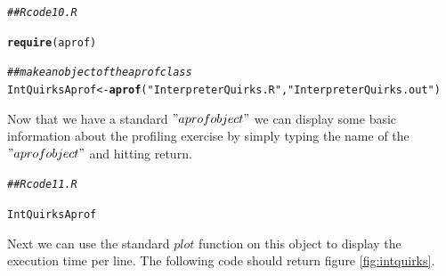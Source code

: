 \documentclass{article}\usepackage[]{graphicx}\usepackage[]{color}
\makeatletter
\newcommand{\hlstr}[1]{\textcolor[rgb]{0.192,0.494,0.8}{#1}}%
\newcommand{\hlcom}[1]{\textcolor[rgb]{0.678,0.584,0.686}{\textit{#1}}}%
\newcommand{\hlstd}[1]{\textcolor[rgb]{0.345,0.345,0.345}{#1}}%
\newcommand{\hlkwb}[1]{\textcolor[rgb]{0.69,0.353,0.396}{#1}}%
\newcommand{\hlkwd}[1]{\textcolor[rgb]{0.737,0.353,0.396}{\textbf{#1}}}%
\newenvironment{kframe}{%
 \def\at@end@of@kframe{}%
 \ifinner\ifhmode%
  \def\at@end@of@kframe{\end{minipage}}%
  \begin{minipage}{\columnwidth}%
 \fi\fi%
 \def\FrameCommand##1{\hskip\@totalleftmargin \hskip-\fboxsep
 \colorbox{shadecolor}{##1}\hskip-\fboxsep
     \hskip-\linewidth \hskip-\@totalleftmargin \hskip\columnwidth}%
 \MakeFramed {\advance\hsize-\width
   \@totalleftmargin\z@ \linewidth\hsize
   \@setminipage}}%
 {\par\unskip\endMakeFramed%
 \at@end@of@kframe}
\newenvironment{knitrout}{}{} %
\makeatother
\begin{document}
\begin{knitrout}
\color{fgcolor}\begin{kframe}
\begin{alltt}
\hlcom{## Rcode10.R}

\hlkwd{require}\hlstd{(aprof)}
\end{alltt}


{\ttfamily\noindent\itshape\color{messagecolor}{\#\# Loading required package: aprof}}\begin{alltt}
\hlcom{##make an object of the aprof class}
\hlstd{IntQuirksAprof} \hlkwb{<-} \hlkwd{aprof}\hlstd{(}\hlstr{"InterpreterQuirks.R"}\hlstd{,}\hlstr{"InterpreterQuirks.out"}\hlstd{)}
\end{alltt}


{\ttfamily\noindent\color{warningcolor}{\#\# Warning: cannot open file 'InterpreterQuirks.out': No such file or directory}}

{\ttfamily\noindent\bfseries\color{errorcolor}{\#\# Error: cannot open the connection}}\end{kframe}
\end{knitrout}

Now that we have a standard $"aprof object"$ we can display some basic information about the profiling exercise by simply typing the name of the $"aprof object"$ and hitting return.

\begin{knitrout}
\color{fgcolor}\begin{kframe}
\begin{alltt}
\hlcom{## Rcode11.R}

\hlstd{IntQuirksAprof}
\end{alltt}


{\ttfamily\noindent\bfseries\color{errorcolor}{\#\# Error: object 'IntQuirksAprof' not found}}\end{kframe}
\end{knitrout}

Next we can use the standard $plot$ function on this object to display the execution time per line.
The following code should return figure \ref{fig:intquirks}. 
\end{document}
